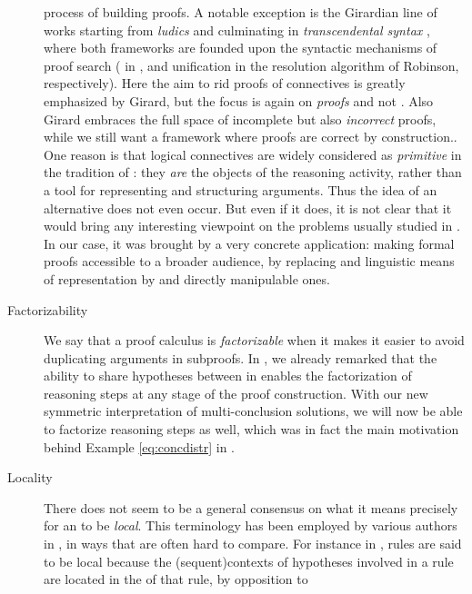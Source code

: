 \begin{scope}
\begin{description}
{    process of building proofs. A notable exception is the Girardian line of
    works starting from \emph{ludics} \cite{girard_locus_2001} and culminating
    in \emph{transcendental syntax} \cite{eng_exegesis_2023}, where both
    frameworks are founded upon the syntactic mechanisms of proof search
    ( in , and unification in the resolution algorithm
    of Robinson, respectively). Here the aim to rid proofs of connectives is
    greatly emphasized by Girard, but the focus is again on \emph{proofs} and
    not \emph{}. Also Girard embraces the full space of incomplete
    but also \emph{incorrect} proofs, while we still want a framework where
    proofs are correct by construction.}. One reason is that logical connectives
    are widely considered as \emph{primitive} in the tradition of : they \emph{are} the objects of the reasoning activity, rather than a
    tool for representing and structuring arguments. Thus the idea of an
    alternative does not even occur. But even if it does, it is not clear that
    it would bring any interesting viewpoint on the problems usually studied in
    . In our case, it was brought by a very concrete application:
    making formal proofs accessible to a broader audience, by replacing 
    and linguistic means of representation by  and directly manipulable
    ones.
  \item[Factorizability]
    We say that a proof calculus is \emph{factorizable} when it makes it easier
    to avoid duplicating arguments in subproofs. In , we
    already remarked that the ability to share hypotheses between  in
     enables the factorization of \emph{} reasoning steps at any
    stage of the proof construction. With our new symmetric interpretation of
    multi-conclusion solutions, we will now be able to factorize \emph{}
    reasoning steps as well, which was in fact the main motivation behind
    Example \ref{eq:concdistr} in .
  \item[Locality]
    There does not seem to be a general consensus on what it means precisely for
    an  to be \emph{local}. This terminology has been
    employed by various authors in , in ways that are often
    hard to compare. For instance in , rules are
    said to be local because the \kl(sequent){contexts} of hypotheses involved in a rule are
    located in the  of that rule, by opposition to 
\end{description}
\end{scope}
